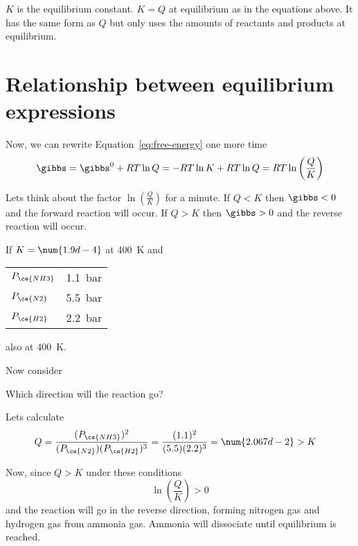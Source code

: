 \documentclass[../mit-general-chemistry.tex]{subfiles}
\begin{document}
$K$ is the equilibrium constant. $K = Q$ at equilibrium as in the
equations above. It has the same form as $Q$ but only uses the amounts
of reactants and products at equilibrium.






\section{Relationship between equilibrium expressions}




Now, we can rewrite Equation~\ref{eq:free-energy} one more time
\begin{equation}
  \gibbs = \gibbs^0 + RT \ln Q = -RT \ln K + RT \ln Q = RT \ln\left(\frac{Q}{K}\right)
\end{equation}

Lets think about the factor $\ln\left(\frac{Q}{K}\right)$ for a
minute. If $Q < K$ then $\gibbs < 0$ and the forward reaction will
occur. If $Q > K$ then $\gibbs > 0$ and the reverse reaction will
occur.


\begin{example}
  If $K = \num{1.9d-4}$ at \SI{400}{\kelvin} and
  \begin{center}
    \begin{tabular}{ll}
      $P_{\ce{NH3}}$ & \SI{1.1}{\bar} \\
      $P_{\ce{N2}}$ & \SI{5.5}{\bar} \\
      $P_{\ce{H2}}$ & \SI{2.2}{\bar} \\
    \end{tabular}
  \end{center}
  also at \SI{400}{\kelvin}.

  Now consider

  Which direction will the reaction go?

  Lets calculate
  \begin{align*}
    Q &= \frac{(P_{\ce{NH3}})^2}{(P_{\ce{N2}})(P_{\ce{H2}})^3} =
    \frac{(1.1)^2}{(5.5)(2.2)^3} =
    \num{2.067d-2} > K
  \end{align*}

  Now, since $Q > K$ under these conditions
  \begin{equation*}
    \ln\left(\frac{Q}{K}\right) > 0
  \end{equation*}
  and the reaction will go in the
  reverse direction, forming nitrogen gas and hydrogen gas from ammonia
  gas. Ammonia will dissociate until equilibrium is reached.
\end{example}
\end{document}
